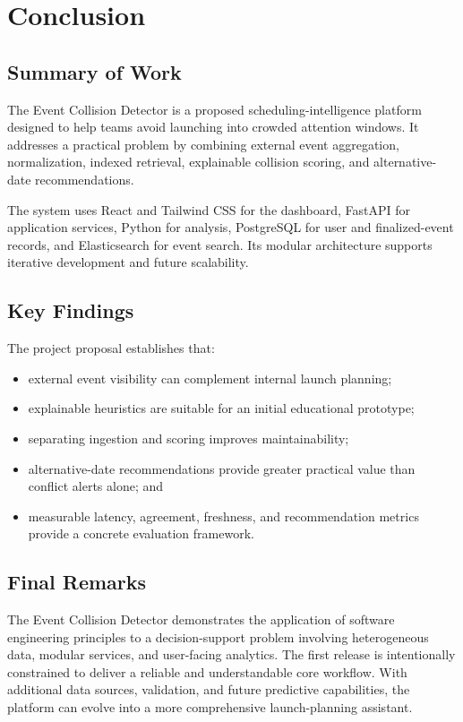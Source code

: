 \documentclass[12pt]{article}
\begin{document}
\section{Conclusion}

\subsection{Summary of Work}
The Event Collision Detector is a proposed scheduling-intelligence platform designed to help teams avoid launching into crowded attention windows. It addresses a practical problem by combining external event aggregation, normalization, indexed retrieval, explainable collision scoring, and alternative-date recommendations.

The system uses React and Tailwind CSS for the dashboard, FastAPI for application services, Python for analysis, PostgreSQL for user and finalized-event records, and Elasticsearch for event search. Its modular architecture supports iterative development and future scalability.

\subsection{Key Findings}
The project proposal establishes that:
\begin{itemize}[leftmargin=0.7cm]
\item external event visibility can complement internal launch planning;
\item explainable heuristics are suitable for an initial educational prototype;
\item separating ingestion and scoring improves maintainability;
\item alternative-date recommendations provide greater practical value than conflict alerts alone; and
\item measurable latency, agreement, freshness, and recommendation metrics provide a concrete evaluation framework.
\end{itemize}

\subsection{Final Remarks}
The Event Collision Detector demonstrates the application of software engineering principles to a decision-support problem involving heterogeneous data, modular services, and user-facing analytics. The first release is intentionally constrained to deliver a reliable and understandable core workflow. With additional data sources, validation, and future predictive capabilities, the platform can evolve into a more comprehensive launch-planning assistant.
\end{document}
